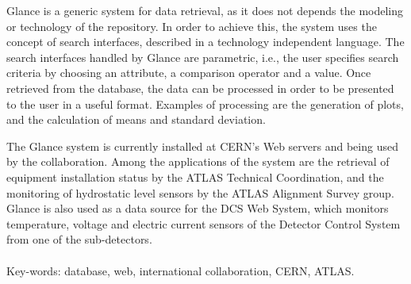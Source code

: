 Glance is a generic system for data retrieval, as it does not depends the
modeling or technology of the repository.
%
In order to achieve this, the system uses the concept of search interfaces,
described in a technology independent language.
%
The search interfaces handled by Glance are parametric, i.e., the user specifies
search criteria by choosing an attribute, a comparison operator and a value.
%
Once retrieved from the database, the data can be processed in order to be
presented to the user in a useful format. Examples of processing are the
generation of plots, and the calculation of means and standard deviation.

The Glance system is currently installed at CERN's Web servers and being used by
the collaboration.
%
Among the applications of the system are the retrieval of
equipment installation status by the ATLAS Technical Coordination, and the
monitoring of hydrostatic level sensors by the ATLAS Alignment Survey group.
%
Glance is also used as a data source for the DCS Web System, which monitors
temperature, voltage and electric current sensors of the Detector Control System
from one of the sub-detectors.

\paragraph{}

\noindent Key-words: database, web, international collaboration, CERN, ATLAS.



\vfill
